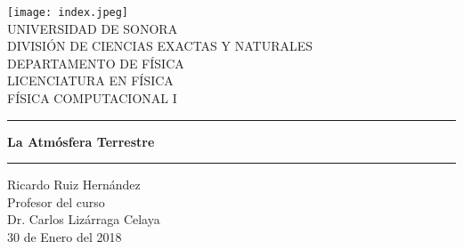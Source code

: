 \documentclass{article}
\begin{document}
\begin{center}
\texttt{[image: index.jpeg]}
\\
\vspace{0.5cm}
UNIVERSIDAD DE SONORA \\
\vspace{0.5cm}
DIVISIÓN DE CIENCIAS EXACTAS Y NATURALES \\
\vspace{0.5cm}
DEPARTAMENTO DE FÍSICA\\
\vspace{0.5cm}
LICENCIATURA EN FÍSICA\\
\vspace{0.5cm}
FÍSICA COMPUTACIONAL I

\vspace{2 cm}
\hrule
\vspace{1 cm}

{\huge \bfseries {La Atmósfera Terrestre}}
\\

\vspace{1 cm}
\hrule
\vspace{2 cm}
Ricardo Ruiz Hernández\\ 
\vspace{1 cm}
Profesor del curso\\
Dr. Carlos Lizárraga Celaya\\
\vspace{2 cm}
30 de Enero del 2018
\end{center}
\end{document}

